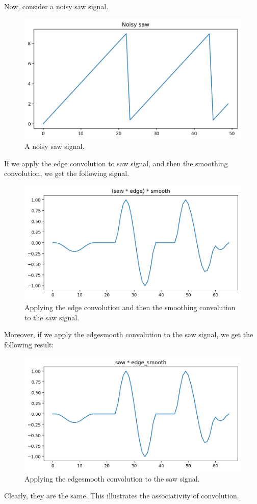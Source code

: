 \documentclass[a4paper, openany]{memoir}
\begin{document}
\noindent Now, consider a noisy saw signal.
\begin{figure}[H]
    \centering
    \includegraphics[scale=0.5]{src/6.17 noisy saw.png}
    \caption{A noisy saw signal.}
\end{figure}
\noindent If we apply the edge convolution to saw signal, and then the smoothing convolution, we get the following signal.
\begin{figure}[H]
    \centering
    \includegraphics[scale=0.5]{src/6.18 saw, edge, smooth.png}
    \caption{Applying the edge convolution and then the smoothing convolution to the saw signal.}
\end{figure}
\noindent Moreover, if we apply the edgesmooth convolution to the saw signal, we get the following result:
\begin{figure}[H]
    \centering
    \includegraphics[scale=0.5]{src/6.19 saw, edgesmooth.png}
    \caption{Applying the edgesmooth convolution to the saw signal.}
\end{figure}
\noindent Clearly, they are the same. This illustrates the associativity of convolution.
\end{document}
